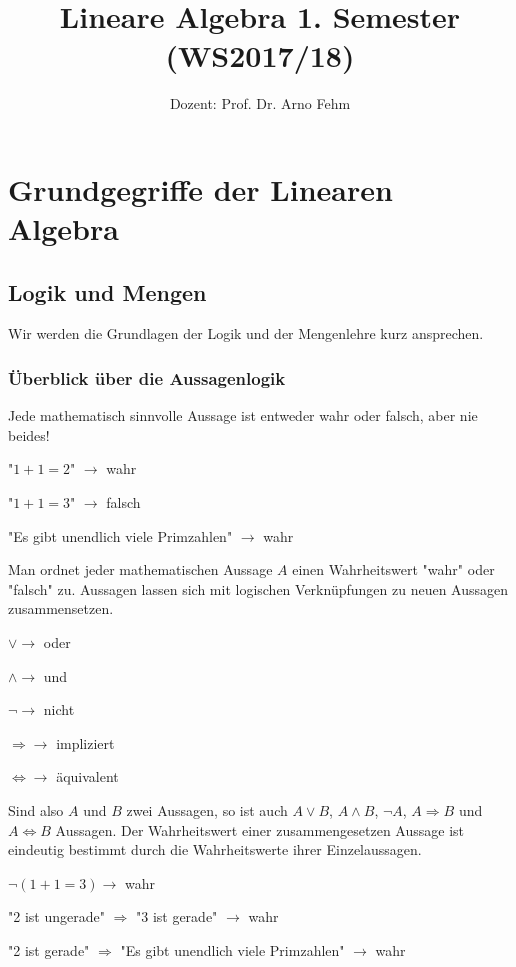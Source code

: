 \documentclass[11pt]{article}
\title{\textbf{Lineare Algebra 1. Semester (WS2017/18)}}
\author{Dozent: Prof. Dr. Arno Fehm}
\date{}
\begin{document}
\maketitle
\renewcommand*{\arraystretch}{1.4}

\raggedright 
\section{Grundgegriffe der Linearen Algebra}
	\subsection{Logik und Mengen}
		Wir werden die Grundlagen der Logik und der Mengenlehre kurz ansprechen.
		\subsubsection{\"Uberblick \"uber die Aussagenlogik}
			Jede mathematisch sinnvolle Aussage ist entweder wahr oder falsch, aber nie beides!
			\begin{compactitem}
				\item "$1+1=2$" $\to$ wahr
				\item "$1+1=3$" $\to$ falsch
				\item "Es gibt unendlich viele Primzahlen" $\to$ wahr
			\end{compactitem}
			Man ordnet jeder mathematischen Aussage $A$ einen Wahrheitswert "wahr" oder "falsch" zu. Aussagen
			lassen sich mit logischen Verkn\"upfungen zu neuen Aussagen zusammensetzen.
			\begin{compactitem}
				\item $\lor \to$ oder
				\item $\land \to$ und
				\item $\lnot \to$ nicht
				\item $\Rightarrow \to$ impliziert
				\item $\iff \to$ \"aquivalent
			\end{compactitem}
			Sind also $A$ und $B$ zwei Aussagen, so ist auch $A \lor B$, $A \land B$, $\lnot A$, 
			$A \Rightarrow B$ und $A \iff B$ Aussagen. Der Wahrheitswert einer zusammengesetzen Aussage ist
			eindeutig bestimmt durch die Wahrheitswerte ihrer Einzelaussagen.
			\begin{compactitem}
				\item $\lnot (1+1=3) \to$ wahr
				\item "2 ist ungerade" $\Rightarrow$ "3 ist gerade" $\to$ wahr
				\item "2 ist gerade" $\Rightarrow$ "Es gibt unendlich viele Primzahlen" $\to$ wahr
			\end{compactitem}
\end{document}
